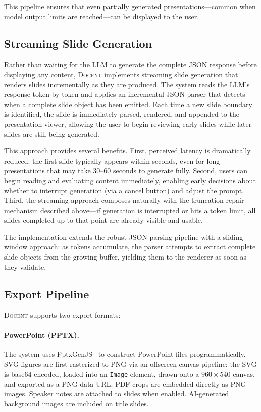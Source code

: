 \documentclass[11pt,a4paper]{article}
\newcommand{\system}{\textsc{Docent}\xspace}
\begin{document}
This pipeline ensures that even partially generated presentations---common when model output limits are reached---can be displayed to the user.

\subsection{Streaming Slide Generation}
\label{sec:streaming}

Rather than waiting for the LLM to generate the complete JSON response before displaying any content, \system implements streaming slide generation that renders slides incrementally as they are produced.
The system reads the LLM's response token by token and applies an incremental JSON parser that detects when a complete slide object has been emitted.
Each time a new slide boundary is identified, the slide is immediately parsed, rendered, and appended to the presentation viewer, allowing the user to begin reviewing early slides while later slides are still being generated.

This approach provides several benefits.
First, perceived latency is dramatically reduced: the first slide typically appears within seconds, even for long presentations that may take 30--60 seconds to generate fully.
Second, users can begin reading and evaluating content immediately, enabling early decisions about whether to interrupt generation (via a cancel button) and adjust the prompt.
Third, the streaming approach composes naturally with the truncation repair mechanism described above---if generation is interrupted or hits a token limit, all slides completed up to that point are already visible and usable.

The implementation extends the robust JSON parsing pipeline with a sliding-window approach: as tokens accumulate, the parser attempts to extract complete slide objects from the growing buffer, yielding them to the renderer as soon as they validate.

\subsection{Export Pipeline}

\system supports two export formats:

\paragraph{PowerPoint (PPTX).}
The system uses PptxGenJS~\citep{pptxgenjs2024} to construct PowerPoint files programmatically.
SVG figures are first rasterized to PNG via an offscreen canvas pipeline: the SVG is base64-encoded, loaded into an \texttt{Image} element, drawn onto a $960 \times 540$ canvas, and exported as a PNG data URL.
PDF crops are embedded directly as PNG images.
Speaker notes are attached to slides when enabled.
AI-generated background images are included on title slides.
\end{document}
